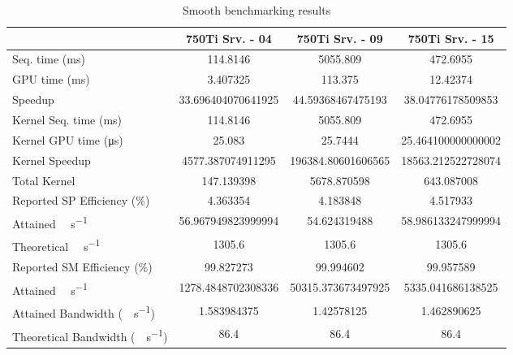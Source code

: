 \begin{table}[H]
	\centering
	\caption{Smooth benchmarking results}
	\label{tab:smooth-results}
	\begin{tabular}{lS[table-format=7.1]S[table-format=7.1]S[table-format=7.1]}
		\toprule
			~ & {\textbf{750Ti Srv. - 04}} & {\textbf{750Ti Srv. - 09}} & {\textbf{750Ti Srv. - 15}} \\
		\midrule
			{Seq. time (\si{\milli\second})} & 114.8146 & 5055.809 & 472.6955 \\
			{GPU time (\si{\milli\second})} & 3.407325 & 113.375 & 12.42374 \\
			{Speedup} & 33.696404070641925 &44.59368467475193 & 38.04776178509853 \\
		\midrule
			{Kernel Seq. time (\si{\milli\second})} & 114.8146 & 5055.809 & 472.6955 \\
			{Kernel GPU time (\si{\micro\second})} & 25.083 & 25.7444 & 25.464100000000002 \\
			{Kernel Speedup} & 4577.387074911295 & 196384.80601606565 & 18563.212522728074 \\
		\midrule
			{Total Kernel \si{\mega\flops}} & 147.139398 & 5678.870598 & 643.087008 \\
			{Reported SP Efficiency (\si{\percent})} & 4.363354 & 4.183848 & 4.517933 \\
			{Attained \si{\giga\flops\per\second}} & 56.967949823999994 & 54.624319488 & 58.986133247999994 \\
			{Theoretical \si{\giga\flops\per\second}} & 1305.6 & 1305.6 & 1305.6 \\
		\midrule
			{Reported SM Efficiency (\si{\percent})} & 99.827273 & 99.994602 & 99.957589 \\
			{Attained \si{\giga\iops\per\second}} & 1278.4848702308336 & 50315.373673497925 & 5335.041686138525 \\			
		\midrule
			{Attained Bandwidth (\si{\giga\byte\per\second})} & 1.583984375 & 1.42578125  & 1.462890625 \\
			{Theoretical Bandwidth (\si{\giga\byte\per\second})}	& 86.4 & 86.4 & 86.4 \\
		\bottomrule
	\end{tabular}
\end{table}